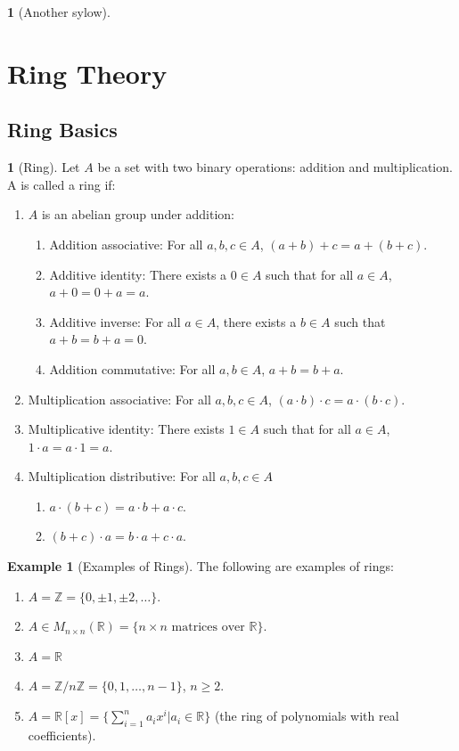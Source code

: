\documentclass[12pt]{article}
\theoremstyle{definition}
\newtheorem{definition}{\color{NavyBlue}{\textbf{Definition}}}
\newtheorem{theorem}{\color{ForestGreen}{\textbf{Theorem}}}
\newcommand{\R}{\mathbb{R}}
\newcommand{\Z}{\mathbb{Z}}
\newtheorem{example}{\color{WildStrawberry}Example}
\theoremstyle{definition}
\begin{document}
\begin{theorem}[Another sylow]

\end{theorem}

\section{Ring Theory}
\subsection{Ring Basics}
\begin{definition}[Ring]
Let $A$ be a set with two binary operations: addition and multiplication. A is called a ring if:
\begin{enumerate}
	\item $A$ is an abelian group under addition:
	\begin{enumerate}
		\item Addition associative: For all $a,b,c \in A$, $(a+b) + c = a + (b+c)$.
		\item Additive identity: There exists a $0 \in A$ such that for all $a \in A$, $a + 0 = 0 + a = a$. 
		\item Additive inverse: For all $a \in A$, there exists a $b \in A$ such that $a + b = b + a = 0$. 
		\item Addition commutative: For all $a,b \in A$, $a + b = b + a$.
	\end{enumerate}
	\item Multiplication associative: For all $a,b,c \in A$, $(a \cdot b) \cdot c = a \cdot (b \cdot c)$. 
	\item Multiplicative identity: There exists $1 \in A$ such that for all $a \in A$, $1 \cdot a = a \cdot 1 = a$.
	\item Multiplication distributive: For all $a,b,c \in A$
	\begin{enumerate}
		\item $a \cdot (b + c) = a\cdot b + a \cdot c$.
		\item $(b + c) \cdot a = b\cdot a + c \cdot a$.
	\end{enumerate}
\end{enumerate}
\end{definition}

\begin{example}[Examples of Rings]
The following are examples of rings:
\begin{enumerate}
	\item $A = \Z = \{0, \pm 1, \pm 2, \ldots \}$. 
	\item $A \in M_{n\times n}(\R) = \{n\times n \text{ matrices over } \R \}$.
	\item $A = \R$
	\item $A = \Z / n\Z = \{0,1,\ldots,n-1\}$, $n \geq 2$.
	\item $A = \R[x] = \{\sum_{i=1}^n a_i x^i | a_i \in \R\}$ (the ring of polynomials with real coefficients).
\end{enumerate}
\end{example}
\end{document}
